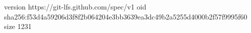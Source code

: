 version https://git-lfs.github.com/spec/v1
oid sha256:f53d4a59206d3f8f2b064204e3bb3639ea3dc49b2a5255d4000b2f57f9995f60
size 1231
